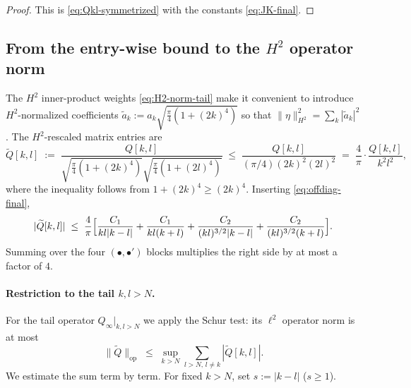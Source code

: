 \begin{proof}
This is \eqref{eq:Qkl-symmetrized} with the constants \eqref{eq:JK-final}.
\end{proof}

\subsection{From the entry-wise bound to the $H^{2}$ operator norm}
\label{sec:schur-step}

The $H^{2}$ inner-product weights \eqref{eq:H2-norm-tail} make it
convenient to introduce $H^{2}$-normalized coefficients
$\tilde a_{k} := a_{k}\sqrt{\tfrac{\pi}{4}(1+(2k)^{4})}$ so that
$\|\eta\|_{H^{2}}^{2} = \sum_{k}|\tilde a_{k}|^{2}$.  The
$H^{2}$-rescaled matrix entries are
\begin{equation}\label{eq:Qkl-H2}
   \widetilde Q[k,l]
   \;:=\;
   \frac{Q[k,l]}{\sqrt{\tfrac{\pi}{4}(1+(2k)^{4})}
                  \sqrt{\tfrac{\pi}{4}(1+(2l)^{4})}}
   \;\leq\;
   \frac{Q[k,l]}{(\pi/4)(2k)^{2}(2l)^{2}}
   \;=\;
   \frac{4}{\pi}\cdot\frac{Q[k,l]}{k^{2} l^{2}},
\end{equation}
where the inequality follows from $1 + (2k)^{4} \geq (2k)^{4}$.
Inserting \eqref{eq:offdiag-final},
\begin{equation}\label{eq:tildeQ-bound}
   |\widetilde Q[k,l]|
   \;\leq\;
   \frac{4}{\pi}\Bigl[\frac{C_{1}}{kl|k-l|} + \frac{C_{1}}{kl(k+l)}
                    + \frac{C_{2}}{(kl)^{3/2}|k-l|}
                    + \frac{C_{2}}{(kl)^{3/2}(k+l)}\Bigr].
\end{equation}
Summing over the four $(\bullet,\bullet')$ blocks multiplies the
right side by at most a factor of $4$.

\paragraph{Restriction to the tail $k, l > N$.}
For the tail operator $Q_{\infty}|_{k,l > N}$ we apply the Schur test:
its $\ell^{2}$ operator norm is at most
\begin{equation}\label{eq:schur}
   \|\widetilde Q\|_{\mathrm{op}}
   \;\leq\;
   \sup_{k > N}\sum_{l > N,\, l \ne k} |\widetilde Q[k,l]|.
\end{equation}
We estimate the sum term by term.  For fixed $k > N$, set $s := |k-l|$
($s \geq 1$).

